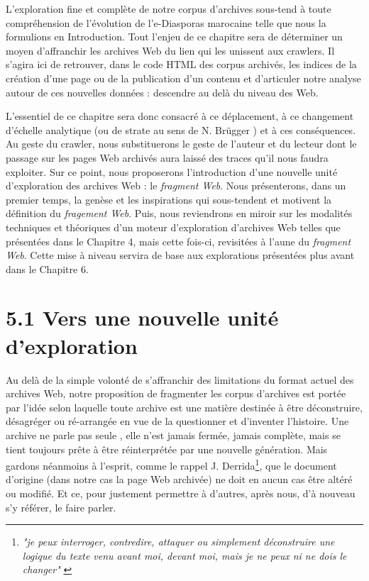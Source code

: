 \documentclass{tufte-book}
\begin{document}
L'exploration fine et complète de notre corpus d'archives sous-tend à toute compréhension de l'évolution de l'e-Diasporas marocaine telle que nous la formulions en Introduction. Tout l'enjeu de ce chapitre sera de déterminer un moyen d'affranchir les archives Web du lien qui les unissent aux crawlers. Il s'agira ici de retrouver, dans le code HTML des corpus archivés, les indices de la création d'une page ou de la publication d'un contenu et d'articuler notre analyse autour de ces nouvelles données : descendre au delà du niveau des Web. 

L'essentiel de ce chapitre sera donc consacré à ce déplacement, à ce changement d'échelle analytique (ou de strate au sens de N. Brügger \citep{brugger_website_2009}) et à ces conséquences. Au geste du crawler, nous substituerons le geste de l'auteur et du lecteur dont le passage sur les pages Web archivés aura laissé des traces qu'il nous faudra exploiter. Sur ce point, nous proposerons l'introduction d'une nouvelle unité d'exploration des archives Web : le \textit{fragment Web}. Nous présenterons, dans un premier temps, la genèse et les inspirations qui sous-tendent et motivent la définition du \textit{fragement Web}. Puis, nous reviendrons en miroir sur les modalités techniques et théoriques d'un moteur d'exploration d'archives Web telles que présentées dans le Chapitre 4, mais cette fois-ci, revisitées à l'aune du \textit{fragment Web}. Cette mise à niveau servira de base aux explorations présentées plus avant dans le Chapitre 6.

\section{5.1 Vers une nouvelle unité d'exploration}

\par\noindent Au delà de la simple volonté de s'affranchir des limitations du format actuel des archives Web, notre proposition de fragmenter les corpus d'archives est portée par l'idée selon laquelle toute archive est une matière destinée à être déconstruire, désagréger ou ré-arrangée en vue de la questionner et d'inventer l'histoire. Une archive ne parle pas seule \citep{ketelaar_de_2006}, elle n'est jamais fermée, jamais complète, mais se tient toujours prête à être réinterprétée par une nouvelle génération. Mais gardons néanmoins à l'esprit, comme le rappel J. Derrida\footnote{\textit{"je peux interroger, contredire, attaquer ou simplement déconstruire une logique du texte venu avant moi, devant moi, mais je ne peux ni ne dois le changer"} \cite{derrida_mal_1995}}, que le document d'origine (dans notre cas la page Web archivée) ne doit en aucun cas être altéré ou modifié. Et ce, pour justement permettre à d'autres, après nous, d'à nouveau s'y référer, le faire parler. 
\end{document}
